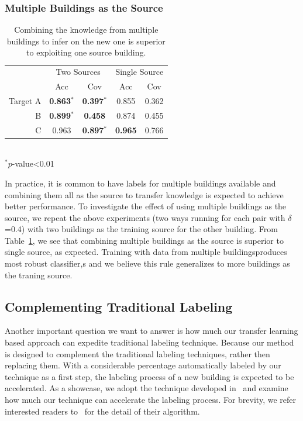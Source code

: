 \subsubsection{Multiple Buildings as the Source}
\begin{table}[h]
\centering
\begin{tabular}{r|cc|cc}
\hline
\multirow{2}{*}{} & \multicolumn{2}{c|}{Two Sources} & \multicolumn{2}{c}{Single Source} \\ \cline{2-5} 
 & Acc & Cov & Acc & Cov \\ \hline
Target A & {\bf 0.863$^\ast$} & {\bf 0.397$^\ast$} & 0.855 & 0.362 \\ \hline
B & {\bf 0.899$^\ast$} & {\bf 0.458} & 0.874 & 0.455 \\ \hline
C & 0.963 & {\bf 0.897$^\ast$} & {\bf 0.965} & 0.766 \\ \hline
\end{tabular}
\\\noindent
$^\ast p$-value<0.01
\caption{Combining the knowledge from multiple buildings to infer on the new one is superior to exploiting one source building.}
\label{2source}
\end{table}

In practice, it is common to have labels for multiple buildings available and combining them all as the source to transfer knowledge is expected to achieve better performance.
To investigate the effect of using multiple buildings as the source, we repeat the above experiments (two ways running for each pair with $\delta$=0.4) with two buildings as the training source for the other building. 
From Table~\ref{2source}, we see that combining multiple buildings as the source is superior to single source, as expected.
Training with data from multiple buildingsproduces most robust classifier,s and we believe this rule generalizes to more buildings as the traning source.


\subsection{Complementing Traditional Labeling}
Another important question we want to answer is how much our transfer learning based approach can expedite traditional labeling technique. 
Because our method is designed to complement the traditional labeling techniques, rather then replacing them.
With a considerable percentage automatically labeled by our technique as a first step, the labeling process of a new building is expected to be accelerated.
As a showcase, we adopt the technique developed in~\cite{cikm} and examine how much our technique can accelerate the labeling process.
For brevity, we refer interested readers to~\cite{cikm} for the detail of their algorithm.

